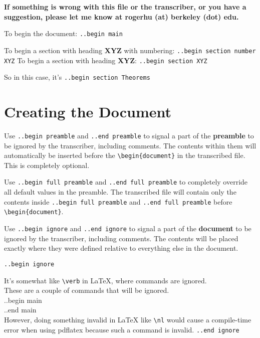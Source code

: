 \documentclass[12pt]{article}
\newcommand{\nl}{\\}
\renewcommand\bold{\textbf}
\begin{document}
\begin{flushleft}

\bold{If something is wrong with this file or the transcriber, or you have a suggestion, please let me know at rogerhu (at) berkeley (dot) edu.}

\bigskip

To begin the document: \verb|..begin main|

\bigskip

To begin a section with heading \bold{XYZ} with numbering: \verb|..begin section number XYZ|
To begin a section with heading \bold{XYZ}: \verb|..begin section XYZ|

So in this case, it's \verb|..begin section Theorems|

\section*{Creating the Document}

Use \verb|..begin preamble| and \verb|..end preamble| to signal a part of the \bold{preamble} to be ignored by the transcriber, including comments. The contents within them will automatically be inserted before the \verb|\begin{document}| in the transcribed file. This is completely optional.

\bigskip

Use \verb|..begin full preamble| and \verb|..end full preamble| to completely override all default values in the preamble. The transcribed file will contain only the contents inside \verb|..begin full preamble| and \verb|..end full preamble| before \verb|\begin{document}|.

\bigskip

Use \verb|..begin ignore| and \verb|..end ignore| to signal a part of the \bold{document} to be ignored by the transcriber, including comments. The contents will be placed exactly where they were defined relative to everything else in the document.

\verb|..begin ignore|

It's somewhat like \verb|\verb| in LaTeX, where commands are ignored. \\
These are a couple of commands that will be ignored. \\
..begin main \\
..end main \\
However, doing something invalid in LaTeX like \verb|\nl| would cause a compile-time error when using pdflatex because such a command is invalid. 
\verb|..end ignore|



\end{flushleft}
\end{document}
